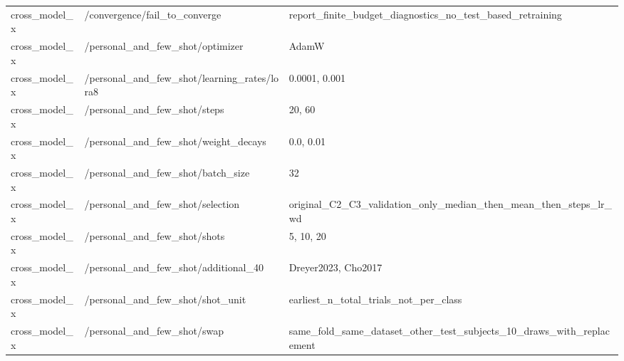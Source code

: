 \begin{longtable}{p{.65in}p{2.8in}p{3.2in}}
cross\_\allowbreak{}model\_\allowbreak{}x & /convergence/fail\_\allowbreak{}to\_\allowbreak{}converge & report\_\allowbreak{}finite\_\allowbreak{}budget\_\allowbreak{}diagnostics\_\allowbreak{}no\_\allowbreak{}test\_\allowbreak{}based\_\allowbreak{}retraining \\
cross\_\allowbreak{}model\_\allowbreak{}x & /personal\_\allowbreak{}and\_\allowbreak{}few\_\allowbreak{}shot/optimizer & AdamW \\
cross\_\allowbreak{}model\_\allowbreak{}x & /personal\_\allowbreak{}and\_\allowbreak{}few\_\allowbreak{}shot/learning\_\allowbreak{}rates/lora8 & 0.0001, 0.001 \\
cross\_\allowbreak{}model\_\allowbreak{}x & /personal\_\allowbreak{}and\_\allowbreak{}few\_\allowbreak{}shot/steps & 20, 60 \\
cross\_\allowbreak{}model\_\allowbreak{}x & /personal\_\allowbreak{}and\_\allowbreak{}few\_\allowbreak{}shot/weight\_\allowbreak{}decays & 0.0, 0.01 \\
cross\_\allowbreak{}model\_\allowbreak{}x & /personal\_\allowbreak{}and\_\allowbreak{}few\_\allowbreak{}shot/batch\_\allowbreak{}size & 32 \\
cross\_\allowbreak{}model\_\allowbreak{}x & /personal\_\allowbreak{}and\_\allowbreak{}few\_\allowbreak{}shot/selection & original\_\allowbreak{}C2\_\allowbreak{}C3\_\allowbreak{}validation\_\allowbreak{}only\_\allowbreak{}median\_\allowbreak{}then\_\allowbreak{}mean\_\allowbreak{}then\_\allowbreak{}steps\_\allowbreak{}lr\_\allowbreak{}wd \\
cross\_\allowbreak{}model\_\allowbreak{}x & /personal\_\allowbreak{}and\_\allowbreak{}few\_\allowbreak{}shot/shots & 5, 10, 20 \\
cross\_\allowbreak{}model\_\allowbreak{}x & /personal\_\allowbreak{}and\_\allowbreak{}few\_\allowbreak{}shot/additional\_\allowbreak{}40 & Dreyer2023, Cho2017 \\
cross\_\allowbreak{}model\_\allowbreak{}x & /personal\_\allowbreak{}and\_\allowbreak{}few\_\allowbreak{}shot/shot\_\allowbreak{}unit & earliest\_\allowbreak{}n\_\allowbreak{}total\_\allowbreak{}trials\_\allowbreak{}not\_\allowbreak{}per\_\allowbreak{}class \\
cross\_\allowbreak{}model\_\allowbreak{}x & /personal\_\allowbreak{}and\_\allowbreak{}few\_\allowbreak{}shot/swap & same\_\allowbreak{}fold\_\allowbreak{}same\_\allowbreak{}dataset\_\allowbreak{}other\_\allowbreak{}test\_\allowbreak{}subjects\_\allowbreak{}10\_\allowbreak{}draws\_\allowbreak{}with\_\allowbreak{}replacement \\
\bottomrule
\end{longtable}
